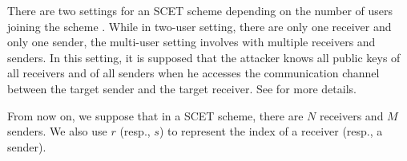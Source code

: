 \documentclass[a4paper,11pt,onecolumn]{elsarticle}
\begin{document}
	There are two settings for an SCET scheme depending on the number of users joining the scheme  \cite{ADR02}.  While in two-user setting, there are only one receiver and only one sender, the multi-user setting involves with multiple receivers and senders.  %
	In  this setting, it is supposed that the attacker knows all public keys of all receivers and of all senders when he accesses the communication channel between the target sender  and the target receiver. See \cite[Subsection 1.3]{Baek07} for more details.	
	
	From now on, we suppose that in a SCET scheme, there are $N$ receivers and $M$ senders. We also use $r$ (resp., $s$) to represent the index of a receiver (resp., a sender). 
	
	
\end{document}
